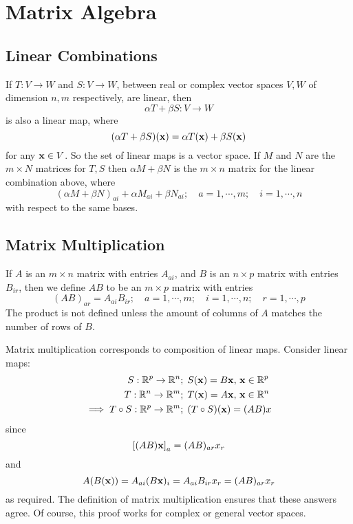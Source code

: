 \documentclass{article}
\begin{document}
\section{Matrix Algebra}
\subsection{Linear Combinations}
If $T: V \to W$ and $S: V \to W$, between real or complex vector spaces $V, W$ of dimension $n, m$ respectively, are linear, then
\[ \alpha T + \beta S: V \to W \]
is also a linear map, where
\[ (\alpha T + \beta S)(\vb x) = \alpha T(\vb x) + \beta S(\vb x) \]
for any $\vb x \in V$. So the set of linear maps is a vector space. If $M$ and $N$ are the $m\times N$ matrices for $T, S$ then $\alpha M + \beta N$ is the $m\times n$ matrix for the linear combination above, where
\[ (\alpha M + \beta N)_{ai} + \alpha M_{ai} + \beta N_{ai};\quad a = 1, \cdots, m;\quad i = 1, \cdots, n \]
with respect to the same bases.

\subsection{Matrix Multiplication}
If $A$ is an $m\times n$ matrix with entries $A_{ai}$, and $B$ is an $n \times p$ matrix with entries $B_{ir}$, then we define $AB$ to be an $m \times p$ matrix with entries
\[ (AB)_{ar} = A_{ai}B_{ir};\quad a = 1, \cdots, m;\quad i = 1, \cdots, n;\quad r = 1, \cdots, p \]
The product is not defined unless the amount of columns of $A$ matches the number of rows of $B$.

Matrix multiplication corresponds to composition of linear maps. Consider linear maps:
\begin{align*}
    S: \mathbb R^p \to \mathbb R^n                  & ;\; S(\vb x) = B \vb x,\, \vb x \in \mathbb R^p \\
    T: \mathbb R^n \to \mathbb R^m                  & ;\; T(\vb x) = A \vb x,\, \vb x \in \mathbb R^n \\
    \implies T \circ S: \mathbb R^p \to \mathbb R^m & ;\; (T\circ S)(\vb x) = (AB)x
\end{align*}
since
\[ \left[ (AB)\vb x \right]_a = (AB)_{ar}x_r \]
and
\[ A(B(\vb x)) = A_{ai} (B\vb x)_i = A_{ai} B_{ir} x_r = (AB)_{ar}x_r \]
as required. The definition of matrix multiplication ensures that these answers agree. Of course, this proof works for complex or general vector spaces.
\end{document}
